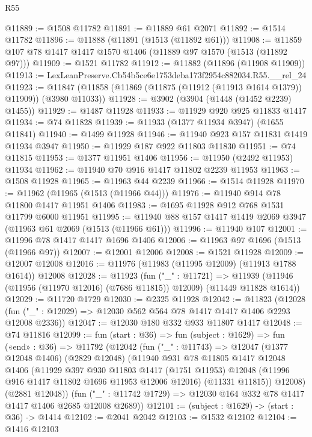 \begin{lexlean}{R55}
\begin{coremodule}
{{@11889 := @1508 @11782
@11891 := @11889 @61 @2071
@11892 := @1514 @11782
@11896 := @11888 (@11891 (@1513 (@11892 @61)))
@11908 := @11859 @107 @78 @1417 @1417 @1570 @1406 (@11889 @97 @1570 (@1513 (@11892 @97)))
@11909 := @1521 @11782
@11912 := @11882 (@11896 (@11908 @11909))
@11913 := LexLeanPreserve.Cb54b5ce6e1753deba173f2954c882034.R55.__rel_24
@11923 := @11847 (@11858 (@11869 (@11875 (@11912 (@11913 @1614 @1379)) @11909)) (@3980 @11033))
@11928 := @3902 (@3904 (@1448 (@1452 @2239) @1455))
@11929 := @1487 @11928
@11933 := @11929 @920 @925 @11833 @1417
@11934 := @74 @11828
@11939 := @11933 (@1377 @11934 @3947) (@1655 @11841)
@11940 := @1499 @11928
@11946 := @11940 @923 @157 @11831 @1419 @11934 @3947
@11950 := @11929 @187 @922 @11803 @11830
@11951 := @74 @11815
@11953 := @1377 @11951 @1406
@11956 := @11950 (@2492 @11953) @11934
@11962 := @11940 @70 @916 @1417 @11802 @2239 @11953
@11963 := @1508 @11928
@11965 := @11963 @44 @2239
@11966 := @1514 @11928
@11970 := @11962 (@11965 (@1513 (@11966 @44)))
@11976 := @11940 @914 @78 @11800 @1417 @11951 @1406
@11983 := @1695 @11928 @912 @768 @1531 @11799 @6000 @11951
@11995 := @11940 @88 @157 @1417 @1419 @2069 @3947 (@11963 @61 @2069 (@1513 (@11966 @61)))
@11996 := @11940 @107
@12001 := @11996 @78 @1417 @1417 @1696 @1406
@12006 := @11963 @97 @1696 (@1513 (@11966 @97))
@12007 := @12001 @12006
@12008 := @1521 @11928
@12009 := @12007 @12008
@12016 := @11976 (@11983 (@11995 @12009) (@11913 @1788 @1614)) @12008
@12028 := @11923
    (fun ("_" : @11721) =>
    @11939 (@11946 (@11956 (@11970 @12016) (@7686 @11815)) @12009) (@11449 @11828 @1614))
@12029 := @11720 @1729
@12030 := @2325 @11928
@12042 := @11823
    (@12028 (fun ("_" : @12029) => @12030 @562 @564 @78 @1417 @1417 @1406 @2293 @12008 @2336))
@12047 := @12030 @180 @332 @933 @11807 @1417
@12048 := @74 @11816
@12099 := fun (start : @36) =>
  fun (subject : @1629) =>
  fun («end» : @36) =>
  @11792
    (@12042
      (fun ("_" : @11743) =>
      @12047
        (@1377 @12048 @1406)
        (@2829 @12048)
        (@11940
          @931
          @78
          @11805
          @1417
          @12048
          @1406
          (@11929
            @397
            @930
            @11803
            @1417
            (@1751 @11953)
            @12048
            (@11996 @916 @1417 @11802 @1696 @11953 @12006 @12016)
            (@11331 @11815))
          @12008)
        (@2881 @12048))
      (fun ("_" : @11742 @1729) => @12030 @164 @332 @78 @1417 @1417 @1406 @2685 @12008 @2689))
@12101 := (subject : @1629) -> (start : @36) -> @1414
@12102 := @2041 @2042
@12103 := @1532 @12102
@12104 := @1416 @12103
}}
\end{coremodule}
\end{lexlean}
